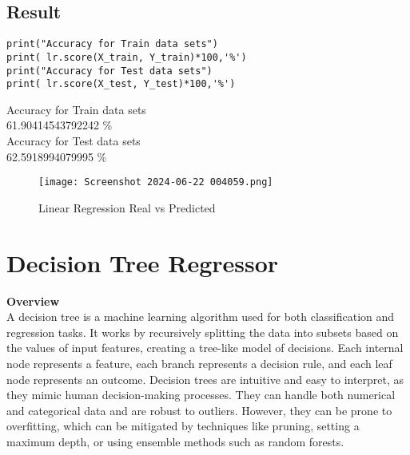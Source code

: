 \documentclass[12pt,a4paper]{report}
\begin{document}
\subsection{Result}
\begin{lstlisting}
print("Accuracy for Train data sets")
print( lr.score(X_train, Y_train)*100,'%')
print("Accuracy for Test data sets")
print( lr.score(X_test, Y_test)*100,'%')
\end{lstlisting}
Accuracy for Train data sets\\
61.90414543792242 \%\\
Accuracy for Test data sets\\
62.5918994079995 \%\\
\begin{figure} [!ht]
    \centering
    \texttt{[image: Screenshot 2024-06-22 004059.png]}
    \caption{Linear Regression Real vs Predicted}
    \label{fig:enter-label}
\end{figure}

\section{Decision Tree Regressor}
\textbf{Overview}\\
A decision tree is a machine learning algorithm used for both classification and regression tasks. It works by recursively splitting the data into subsets based on the values of input features, creating a tree-like model of decisions. Each internal node represents a feature, each branch represents a decision rule, and each leaf node represents an outcome. Decision trees are intuitive and easy to interpret, as they mimic human decision-making processes. They can handle both numerical and categorical data and are robust to outliers. However, they can be prone to overfitting, which can be mitigated by techniques like pruning, setting a maximum depth, or using ensemble methods such as random forests.
\end{document}
